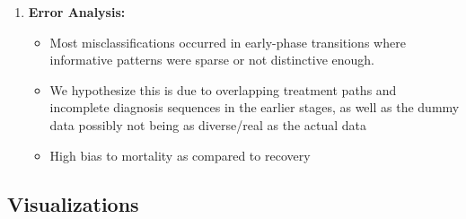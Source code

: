 \documentclass[11pt]{article}
\begin{document}
\begin{enumerate}[noitemsep]
    \item \textbf{Error Analysis:}
    \begin{itemize}[noitemsep]
        \item Most misclassifications occurred in early-phase transitions where informative patterns were sparse or not distinctive enough.
        \item We hypothesize this is due to overlapping treatment paths and incomplete diagnosis sequences in the earlier stages, as well as the dummy data possibly not being as diverse/real as the actual data
        \item High bias to mortality as compared to recovery
    \end{itemize}
\end{enumerate}
\subsection*{Visualizations}
\end{document}
